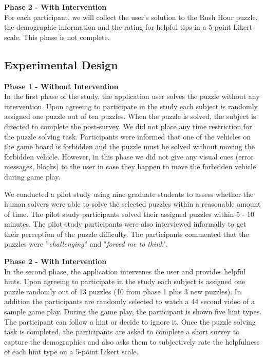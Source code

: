 \documentclass[doctor]{thesis} %
\theoremstyle{plain}
\begin{document}
\textbf{Phase 2 - With Intervention}\\
For each participant, we will collect the user's solution to the Rush Hour puzzle, the demographic information and the rating for helpful tips in a 5-point Likert scale. This phase is not complete.

\subsection*{Experimental Design}
\textbf{Phase 1 - Without Intervention}\\
In the first phase of the study, the application user solves the puzzle without any intervention. Upon agreeing to participate in the study each subject is randomly assigned one puzzle out of ten puzzles. When the puzzle is solved, the subject is directed to complete the post-survey. We did not place any time restriction for the puzzle solving task. Participants were informed that one of the vehicles on the game board is forbidden and the puzzle must be solved without moving the forbidden vehicle. However, in this phase we did not give any visual cues (error messages, blocks) to the user in case they happen to move the forbidden vehicle during game play. 

We conducted a pilot study using nine graduate students to assess whether the human solvers were able to solve the selected puzzles within a reasonable amount of time. The pilot study participants solved their assigned puzzles within 5 - 10 minutes. The pilot study participants were also interviewed informally to get their perception of the puzzle difficulty. The participants commented that the puzzles were ''\textit{challenging}'' and "\textit{forced me to think}".

\textbf{Phase 2 - With Intervention}\\
In the second phase, the application intervenes the user and provides helpful hints. Upon agreeing to participate in the study each subject is assigned one puzzle randomly out of 13 puzzles (10 from phase 1 plus 3 new puzzles). In addition the participants are randomly selected to watch a 44 second video of a sample game play. During the game play, the participant is shown five hint types. The participant can follow a hint or decide to ignore it. Once the puzzle solving task is completed, the participants are asked to complete a short survey to capture the demographics and also asks them to subjectively rate the helpfulness of each hint type on a 5-point Likert scale. 
\end{document}
